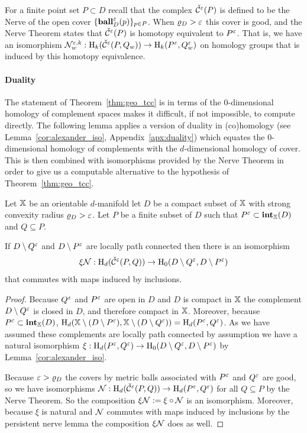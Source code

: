 
For a finite point set $P\subset D$ recall that the \Cech complex $\check{\mathcal{C}}^\varepsilon(P)$ is defined to be the Nerve of the open cover $\{\mathbf{ball}_D^\varepsilon(p)\}_{p\in P}$.
When $\varrho_D > \varepsilon$ this cover is good, and the Nerve Theorem states that $\check{\mathcal{C}}^\varepsilon(P)$ is homotopy equivalent to $P^\varepsilon$.
That is, we have an isomorphism $\mathcal{N}_w^{\varepsilon, k} : \mathrm{H}_k(\check{\mathcal{C}}^\varepsilon(P,Q_w))\to \mathrm{H}_k(P^\varepsilon, Q_w^\varepsilon)$ on homology groups that is induced by this homotopy equivalence.%

\paragraph{Duality}

The statement of Theorem~\ref{thm:geo_tcc} is in terms of the $0$-dimensional homology of complement spaces makes it difficult, if not impossible, to compute directly.
The following lemma applies a version of duality in (co)homology (see Lemma~\ref{cor:alexander_iso}, Appendix~\ref{apx:duality}) which equates the $0$-dimensional homology of complements with the $d$-dimensional homology of cover.
This is then combined with isomorphisms provided by the Nerve Theorem in order to give us a computable alternative to the hypothesis of Theorem~\ref{thm:geo_tcc}.

\begin{lemma}\label{lem:duality_apply}
  Let $\mathbb{X}$ be an orientable $d$-manifold let $D$ be a compact subset of $\mathbb{X}$ with strong convexity radius $\varrho_D > \varepsilon$.
  Let $P$ be a finite subset of $D$ such that $P^\varepsilon\subset \mathbf{int}_{\mathbb{X}}(D)$ and $Q\subseteq P$.

  If $D\setminus Q^\varepsilon$ and $D\setminus P^\varepsilon$ are locally path connected then there is an isomorphism
  \[ \xi\mathcal{N} : \mathrm{H}_d(\check{\mathcal{C}}^\varepsilon(P,Q))\to \mathrm{H}_0(D\setminus Q^\varepsilon, D\setminus P^\varepsilon)\]
  that commutes with maps induced by inclusions.
\end{lemma}
\begin{proof}
  Because $Q^\varepsilon$ and $P^\varepsilon$ are open in $D$ and $D$ is compact in $\mathbb{X}$ the complement $D\setminus Q^\varepsilon$ is closed in $D$, and therefore compact in $\mathbb{X}$.
  Moreover, because $P^\varepsilon\subset \mathbf{int}_{\mathbb{X}}(D)$, $\mathrm{H}_d(\mathbb{X}\setminus(D\setminus P^\varepsilon), \mathbb{X}\setminus(D\setminus Q^\varepsilon)) = \mathrm{H}_d(P^\varepsilon, Q^\varepsilon)$.
  As we have assumed these complements are locally path connected by assumption we have a natural isomorphism $\xi : \mathrm{H}_d(P^\varepsilon, Q^\varepsilon)\to \mathrm{H}_0(D\setminus Q^\varepsilon, D\setminus P^\varepsilon)$
  by Lemma~\ref{cor:alexander_iso}.

  Because $\varepsilon > \varrho_D$ the covers by metric balls associated with $P^\varepsilon$ and $Q^\varepsilon$ are good, so we have isomorphisms $\mathcal{N} : \mathrm{H}_d(\check{\mathcal{C}}^\varepsilon(P, Q))\to \mathrm{H}_d(P^\varepsilon, Q^\varepsilon)$ for all $Q\subseteq P$ by the Nerve Theorem.
  So the composition $\xi\mathcal{N} := \xi\circ\mathcal{N}$ is an isomorphism.
  Moreover, because $\xi$ is natural and $\mathcal{N}$ commutes with maps induced by inclusions by the persistent nerve lemma the composition $\xi\mathcal{N}$ does as well.
\end{proof}

